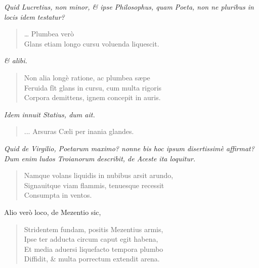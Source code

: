 \documentclass[11pt,twoside,openany]{book}
\begin{document}
\textit{Quid Lucretius, non minor, \& ipse Philosophus, quam Poeta, non ne pluribus in locis idem testatur?}


\begin{verse}

… Plumbea verò \\

Glans etiam longo cursu voluenda liquescit. \\

\end{verse}

\textit{\& alibi.}


\begin{verse}

Non alia longè ratione, ac plumbea sæpe \\

Feruida fît glans in cursu, cum multa rigoris \\

Corpora demittens, ignem concepit in auris. \\

\end{verse}

\textit{Idem innuit Statius, dum ait.}


\begin{verse}

... Arsuras Cæli per inania glandes. \\

\end{verse}

\textit{Quid de Virgilio, Poetarum maximo? nonne bis hoc ipsum disertissimè affirmat? Dum enim ludos Troianorum describit, de Aceste ita loquitur.}


\begin{verse}

Namque volans liquidis in nubibus arsit arundo, \\

Signauitque viam flammis, tenuesque recessit \\

Consumpta in ventos. \\

\end{verse}

Alio verò loco, de Mezentio sic,


\begin{verse}

Stridentem fundam, positis Mezentius armis, \\

Ipse ter adducta circum caput egit habena, \\

Et media aduersi liquefacto tempora plumbo \\

Diffidit, \& multa porrectum extendit arena. \\

\end{verse}
\end{document}
